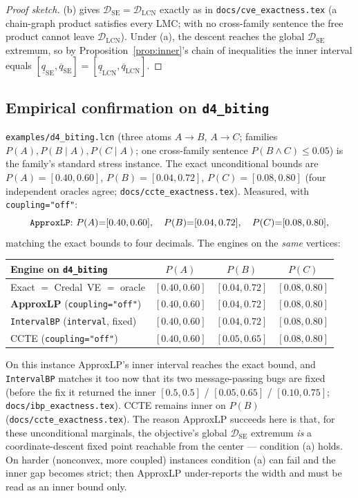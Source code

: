 \documentclass[11pt]{article}
\newcommand{\lo}{\underline}
\newcommand{\hi}{\overline}
\newcommand{\DSE}{\mathcal{D}_{\mathrm{SE}}}
\newcommand{\DLCN}{\mathcal{D}_{\mathrm{LCN}}}
\newcommand{\ALP}{\texttt{ApproxLP}}
\begin{document}
\begin{proof}[Proof sketch]
(b) gives $\DSE=\DLCN$ exactly as in \texttt{docs/cve\_exactness.tex} (a chain-graph product satisfies
every LMC; with no cross-family sentence the free product cannot leave $\DLCN$). Under (a), the
descent reaches the global $\DSE$ extremum, so by Proposition~\ref{prop:inner}'s chain of
inequalities the inner interval equals $[\lo q_{\mathrm{SE}},\hi q_{\mathrm{SE}}]=[\lo
q_{\mathrm{LCN}},\hi q_{\mathrm{LCN}}]$.
\end{proof}

\subsection{Empirical confirmation on \texttt{d4\_biting}}\label{sec:empirical}
\texttt{examples/d4\_biting.lcn} (three atoms $A\to B$, $A\to C$; families $P(A),P(B\mid A),P(C\mid A)$;
one cross-family sentence $P(B\land C)\le0.05$) is the family's standard stress instance. The exact
unconditional bounds are $P(A)=[0.40,0.60]$, $P(B)=[0.04,0.72]$, $P(C)=[0.08,0.80]$ (four independent
oracles agree; \texttt{docs/ccte\_exactness.tex}). Measured, with \texttt{coupling="off"}:
\[
  \text{\ALP: }P(A){=}[0.40,0.60],\quad P(B){=}[0.04,0.72],\quad P(C){=}[0.08,0.80],
\]
matching the exact bounds to four decimals. The engines on the \emph{same} vertices:
\begin{center}\small
\begin{tabular}{lccc}
\toprule
Engine on \texttt{d4\_biting} & $P(A)$ & $P(B)$ & $P(C)$ \\
\midrule
Exact $=$ Credal~VE $=$ oracle          & $[0.40,0.60]$ & $\mathbf{[0.04,0.72]}$ & $[0.08,0.80]$ \\
\textbf{ApproxLP} (\texttt{coupling="off"})      & $[0.40,0.60]$ & $\mathbf{[0.04,0.72]}$ & $[0.08,0.80]$ \\
\texttt{IntervalBP} (\texttt{interval}, fixed) & $[0.40,0.60]$ & $\mathbf{[0.04,0.72]}$ & $[0.08,0.80]$ \\
CCTE (\texttt{coupling="off"})          & $[0.40,0.60]$ & $\mathbf{[0.05,0.65]}$ & $[0.08,0.80]$ \\
\bottomrule
\end{tabular}
\end{center}
On this instance ApproxLP's inner interval reaches the exact bound, and \texttt{IntervalBP} matches
it too now that its two message-passing bugs are fixed (before the fix it returned the inner
$[0.5,0.5]$ / $[0.05,0.65]$ / $[0.10,0.75]$; \texttt{docs/ibp\_exactness.tex}). CCTE remains inner on
$P(B)$ (\texttt{docs/ccte\_exactness.tex}). The reason ApproxLP succeeds here is that, for these
unconditional marginals, the objective's global $\DSE$ extremum \emph{is} a coordinate-descent fixed
point reachable from the center --- condition (a) holds. On harder (nonconvex, more coupled)
instances condition (a) can fail and the inner gap becomes strict; then ApproxLP under-reports the
width and must be read as an inner bound only.
\end{document}
